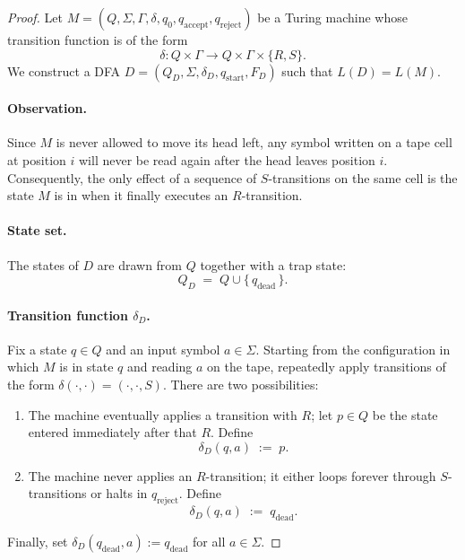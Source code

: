 \documentclass[a4paper, UTF-8]{article}
\theoremstyle{plain}
\begin{document}
\begin{proof}
    Let $M = (Q, \Sigma, \Gamma, \delta, q_0, q_{\text{accept}}, q_{\text{reject}})$ be a Turing machine whose transition function is of the form
    \[
        \delta \colon Q \times \Gamma \longrightarrow Q \times \Gamma \times \{R, S\}.
    \]
    We construct a DFA $D = (Q_D, \Sigma, \delta_D, q_{\text{start}}, F_D)$ such that $L(D) = L(M)$.

    \paragraph{Observation.}
    Since $M$ is never allowed to move its head left, any symbol written on a tape cell at position $i$ will never be read again after the head leaves position $i$. Consequently, the only effect of a sequence of $S$-transitions on the same cell is the state $M$ is in when it finally executes an $R$-transition.

    \paragraph{State set.}
    The states of $D$ are drawn from $Q$ together with a trap state:
    \[
        Q_D \;=\; Q \cup \{\,q_{\text{dead}}\,\}.
    \]

    \paragraph{Transition function $\delta_D$.}
    Fix a state $q \in Q$ and an input symbol $a \in \Sigma$.
    Starting from the configuration in which $M$ is in state $q$ and reading $a$ on the tape,
    repeatedly apply transitions of the form $\delta(\cdot, \cdot) = (\cdot, \cdot, S)$.
    There are two possibilities:
    \begin{enumerate}
        \item[(i)] The machine eventually applies a transition with $R$; let $p \in Q$ be the state entered immediately after that $R$.  Define
            \[
                \delta_D(q, a) \;:=\; p.
            \]
        \item[(ii)] The machine never applies an $R$-transition; it either loops forever through $S$-transitions or halts in $q_{\text{reject}}$.  Define
            \[
                \delta_D(q, a) \;:=\; q_{\text{dead}}.
            \]
    \end{enumerate}
    Finally, set $\delta_D(q_{\text{dead}}, a) := q_{\text{dead}}$ for all $a \in \Sigma$.


\end{proof}
\end{document}
